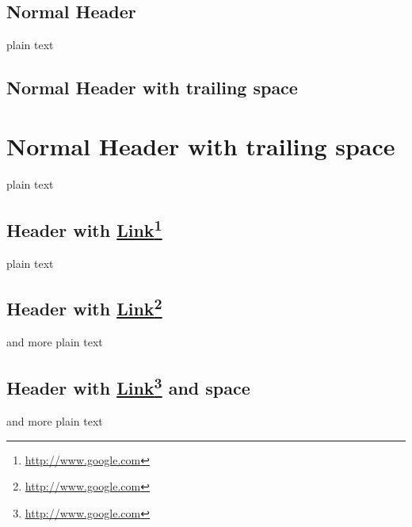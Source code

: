 
\def\mytitle{MultiMarkdown Headers Test}
\def\latexmode{memoir}

\section{Normal Header}
\label{normalheader}

plain text

\section{Normal Header with trailing space}
\label{normalheaderwithtrailingspace}

\chapter{Normal Header with trailing space}
\label{normalheaderwithtrailingspace}

plain text

\section{Header with \href{http://www.google.com}{Link}\footnote{\href{http://www.google.com}{http:\slash \slash www.google.com}}}
\label{headerwithlink}

plain text

\section{Header with \href{http://www.google.com}{Link}\footnote{\href{http://www.google.com}{http:\slash \slash www.google.com}}}
\label{headerwithlink}

and more plain text

\section{Header with \href{http://www.google.com}{Link}\footnote{\href{http://www.google.com}{http:\slash \slash www.google.com}} and space}
\label{headerwithlinkandspace}

and more plain text




